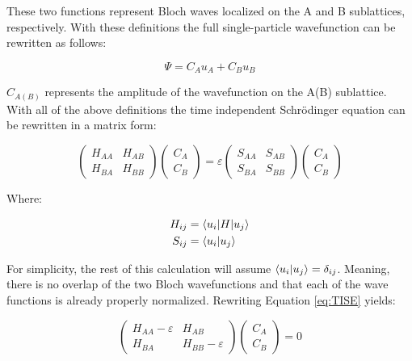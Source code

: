 These two functions represent Bloch waves localized on the A and B sublattices, respectively. With these definitions the full single-particle wavefunction can be rewritten as follows:

\begin{equation}
    \Psi = C_A u_A + C_B u_B
\end{equation}

$C_{A(B)}$ represents the amplitude of the wavefunction on the A(B) sublattice. With all of the above definitions the time independent Schr\"{o}dinger equation can be rewritten in a matrix form:

\begin{equation} 
\label{eq:TISE}
    \begin{pmatrix} H_{AA} & H_{AB} \\ H_{BA} & H_{BB} \end{pmatrix} \begin{pmatrix} C_A \\ C_B \end{pmatrix} = \varepsilon \begin{pmatrix} S_{AA} & S_{AB} \\ S_{BA} & S_{BB} \end{pmatrix} \begin{pmatrix} C_A \\ C_B \end{pmatrix}
\end{equation}

Where:

\begin{align}
\label{eq:matel}
    H_{ij} &= \braket{u_i | H | u_j} \\
    S_{ij} &= \braket{u_i | u_j}
\end{align}

For simplicity, the rest of this calculation will assume $\braket{u_i | u_j} = \delta_{ij}$. Meaning, there is no overlap of the two Bloch wavefunctions and that each of the wave functions is already properly normalized. Rewriting Equation \ref{eq:TISE} yields:

\begin{equation}
\label{eq:secular}
    \begin{pmatrix} H_{AA}-\varepsilon & H_{AB} \\ H_{BA} & H_{BB}-\varepsilon \end{pmatrix} \begin{pmatrix} C_A \\ C_B \end{pmatrix} = 0
\end{equation}

